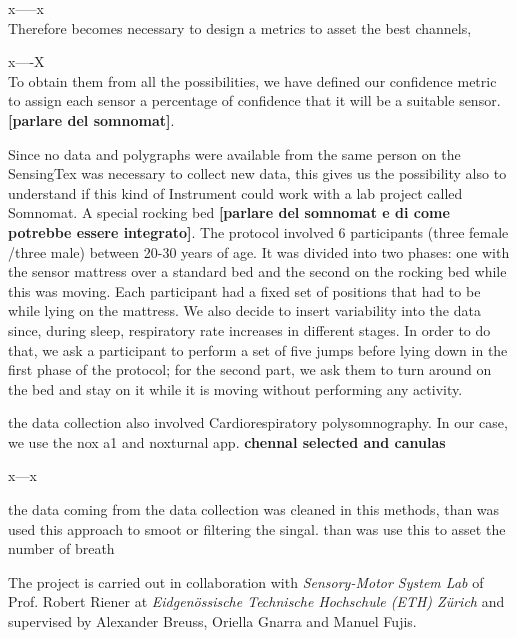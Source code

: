 \documentclass[a4paper,11pt, oneside,italian]{article}
\begin{document}
x-----x \\

Therefore becomes necessary to design a metrics to asset the best channels, 



x----X \\




To obtain them from all the possibilities, we have defined our confidence 
metric to assign each sensor a percentage of confidence that it will be a suitable sensor.
\textbf{[parlare del somnomat]}.

Since no data and polygraphs were available from the same person
on the SensingTex was necessary to collect new data, this gives 
us the possibility also to understand if this kind of Instrument
could work with a lab project called Somnomat. A special 
rocking bed \textbf{[parlare del somnomat e di come potrebbe essere integrato]}. The protocol involved 
6 participants (three female /three male) between 20-30 years of age. It was divided into two phases: one 
with the sensor mattress over a standard bed and the second on the rocking bed while this was moving. 
Each participant had a fixed set of positions that had to be while lying on the mattress. 
We also decide to insert variability into the data since, during sleep, respiratory rate increases in different stages. 
In order to do that, we ask a participant to perform a set of five jumps before lying down in the first 
phase of the protocol; for the second part, we ask them to turn around on the bed and stay on it 
while it is moving without performing any activity.


the data collection also involved Cardiorespiratory polysomnography. In our case, we use the nox a1 and noxturnal app. 
\textbf{chennal selected and canulas}

x---x

the data coming from the data collection was cleaned in this methods, than was used this approach to smoot or filtering the singal.
than was use this to asset the number of breath




The project is carried out in collaboration with \textit{Sensory-Motor System Lab} of Prof. Robert Riener at \textit{Eidgenössische Technische Hochschule 
(ETH) Zürich} and supervised by Alexander Breuss, Oriella Gnarra and Manuel Fujis.
\end{document}
